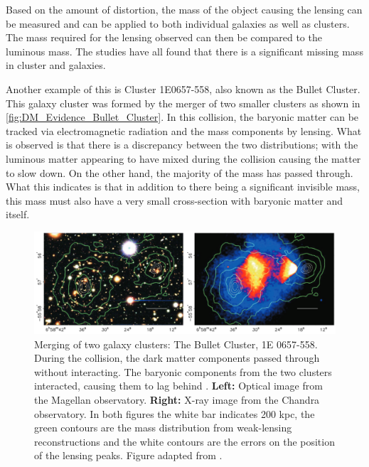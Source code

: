 \par
Based on the amount of distortion, the mass of the object causing the lensing can be measured and can be applied to both individual galaxies as well as clusters.
The mass required for the lensing observed can then be compared to the luminous mass.
The studies have all found that there is a significant missing mass in cluster and galaxies.


\par
Another example of this is Cluster 1E0657-558, also known as the Bullet Cluster.
This galaxy cluster was formed by the merger of two smaller clusters as shown in \autoref{fig:DM_Evidence_Bullet_Cluster}.
In this collision, the baryonic matter can be tracked via electromagnetic radiation and the mass components by lensing.
What is observed is that there is a discrepancy between the two distributions; with the luminous matter appearing to have mixed during the collision causing the matter to slow down.
On the other hand, the majority of the mass has passed through.
What this indicates is that in addition to there being a significant invisible mass, this mass must also have a very small cross-section with baryonic matter and itself.

\begin{figure}[!htbp]%
    \centering
     \includegraphics[width=\textwidth]{Figures/DarkMatterEvidence/bullet_cluster_2.png}
    \caption[Merging of two galaxy cluster, 1E 0657-558]{Merging of two galaxy clusters: The Bullet Cluster, 1E 0657-558.
             During the collision, the dark matter components passed through without interacting.
             The baryonic components from the two clusters interacted, causing them to lag behind .
             \textbf{Left:} Optical image from the Magellan observatory.
             \textbf{Right:} X-ray image from the Chandra observatory.
             In both figures the white bar indicates 200 kpc, the green contours are the mass distribution from weak-lensing reconstructions and the white contours are the errors on the position of the lensing peaks.
             Figure adapted from \cite{bullet_cluster_ref}.}
    \label{fig:DM_Evidence_Bullet_Cluster}
\end{figure}


